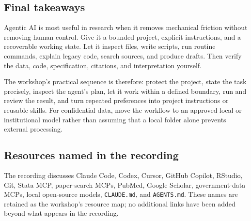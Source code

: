 \documentclass[
  english,
  10pt,
]{article}
\begin{document}
\subsection{Final takeaways}\label{final-takeaways}

Agentic AI is most useful in research when it removes mechanical
friction without removing human control. Give it a bounded project,
explicit instructions, and a recoverable working state. Let it inspect
files, write scripts, run routine commands, explain legacy code, search
sources, and produce drafts. Then verify the data, code, specification,
citations, and interpretation yourself.

The workshop's practical sequence is therefore: protect the project,
state the task precisely, inspect the agent's plan, let it work within a
defined boundary, run and review the result, and turn repeated
preferences into project instructions or reusable skills. For
confidential data, move the workflow to an approved local or
institutional model rather than assuming that a local folder alone
prevents external processing.

\subsection{Resources named in the
recording}\label{resources-named-in-the-recording}

The recording discusses Claude Code, Codex, Cursor, GitHub Copilot,
RStudio, Git, Stata MCP, paper-search MCPs, PubMed, Google Scholar,
government-data MCPs, local open-source models, \texttt{CLAUDE.md}, and
\texttt{AGENTS.md}. These names are retained as the workshop's resource
map; no additional links have been added beyond what appears in the
recording.
\end{document}
